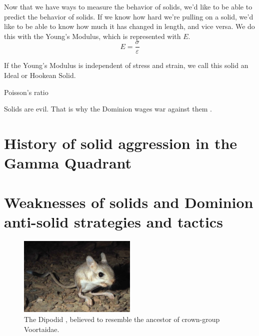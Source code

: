 Now that we have ways to measure the behavior of solids, we'd like to be able to predict the behavior of solids. If we know how hard we're pulling on a solid, we'd like to be able to know how much it has changed in length, and vice versa. We do this with the Young's Modulus, which is represented with $E$.
\begin{equation}
E = \frac{\sigma}{\varepsilon}
\end{equation}

If the Young's Modulus is independent of stress and strain, we call this solid an Ideal or Hookean Solid.

Poisson's ratio

Solids are evil. That is why the Dominion  wages war against them \citep{Son-of-Moog:2488}.

\section{History of solid aggression in the Gamma Quadrant}
\section{Weaknesses of solids and Dominion anti-solid strategies and tactics}
\begin{figure}[h!]
 \label{jaculus}
 \centering
  \includegraphics[width=0.5\textwidth]{ch-solids/figures/jaculus.jpg}
 \caption{The Dipodid , believed to resemble the ancestor of crown-group Voortaidae.}
\end{figure}




